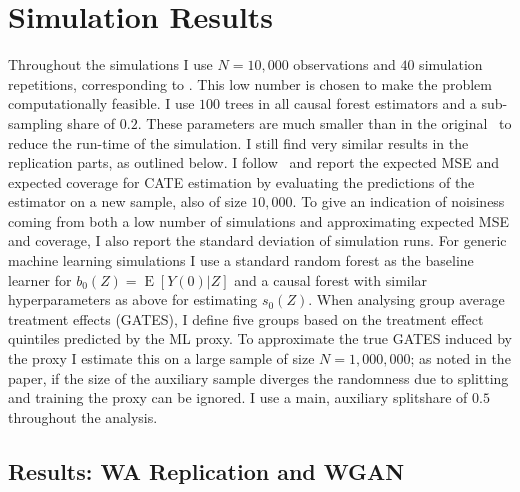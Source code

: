\documentclass[11pt, a4paper, leqno]{article}
\DeclareMathOperator{\E}{E}
\begin{document}
\section{Simulation Results}
Throughout the simulations I use $N=10,000$ observations and $40$ simulation repetitions, corresponding to \cite{wager2018estimation}.
This low number is chosen to make the problem computationally feasible.
I use $100$ trees in all causal forest estimators and a sub-sampling share of $0.2$.
These parameters are much smaller than in the original~\cite{wager2018estimation} to reduce the run-time of the simulation.
I still find very similar results in the replication parts, as outlined below.
I follow~\cite{wager2018estimation} and report the expected MSE and expected coverage for CATE estimation by evaluating the predictions of the estimator on a new sample, also of size $10,000$.
To give an indication of noisiness coming from both a low number of simulations and approximating expected MSE and coverage, I also report the standard deviation of simulation runs.
For generic machine learning simulations I use a standard random forest as the baseline learner for $b_0(Z) = \E[Y(0)|Z]$ and a causal forest with similar hyperparameters as above for estimating $s_0(Z)$.
When analysing group average treatment effects (GATES), I define five groups based on the treatment effect quintiles predicted by the ML proxy.
To approximate the true GATES induced by the proxy I estimate this on a large sample of size $N=1,000,000$; as noted in the paper, if the size of the auxiliary sample diverges the randomness due to splitting and training the proxy can be ignored.
I use a main, auxiliary splitshare of $0.5$ throughout the analysis.

\subsection{Results: WA Replication and WGAN}
\end{document}
